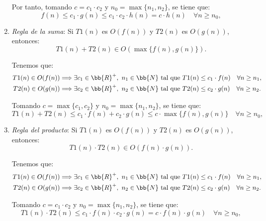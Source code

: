 \begin{ejercicio}
\begin{enumerate}[label=\alph*)]
        Por tanto, tomando $c=c_1\cdot c_2$ y $n_0=\max\{n_1,n_2\}$, se tiene que:
        \begin{equation*}
            f(n)\leq c_1\cdot g(n) \leq c_1\cdot c_2\cdot h(n) = c\cdot h(n) \quad \forall n\geq n_0,
        \end{equation*}

        \item \emph{Regla de la suma}: Si $T1(n)$ es $O(f(n))$ y $T2(n)$ es $O(g(n))$, entonces: $$T1(n)+T2(n)\in O(\max\{f(n),g(n)\}).$$
        
        Tenemos que:
        \begin{align*}
            T1(n)\in O(f(n)) &\Longrightarrow \exists c_1\in \bb{R}^+,~n_1\in \bb{N} \text{ tal que } T1(n)\leq c_1\cdot f(n) \quad \forall n\geq n_1, \\
            T2(n)\in O(g(n)) &\Longrightarrow \exists c_2\in \bb{R}^+,~n_2\in \bb{N} \text{ tal que } T2(n)\leq c_2\cdot g(n) \quad \forall n\geq n_2.
        \end{align*}

        Tomando $c=\max\{c_1,c_2\}$ y $n_0=\max\{n_1,n_2\}$, se tiene que:
        \begin{equation*}
            T1(n)+T2(n)\leq c_1\cdot f(n) + c_2\cdot g(n) \leq c\cdot \max\{f(n),g(n)\} \quad \forall n\geq n_0,
        \end{equation*}

        \item \emph{Regla del producto}: Si $T1(n)$ es $O(f(n))$ y $T2(n)$ es $O(g(n))$, entonces: $$T1(n)\cdot T2(n)\in O(f(n)\cdot g(n)).$$
        
        Tenemos que:
        \begin{align*}
            T1(n)\in O(f(n)) &\Longrightarrow \exists c_1\in \bb{R}^+,~n_1\in \bb{N} \text{ tal que } T1(n)\leq c_1\cdot f(n) \quad \forall n\geq n_1, \\
            T2(n)\in O(g(n)) &\Longrightarrow \exists c_2\in \bb{R}^+,~n_2\in \bb{N} \text{ tal que } T2(n)\leq c_2\cdot g(n) \quad \forall n\geq n_2.
        \end{align*}

        Tomando $c=c_1\cdot c_2$ y $n_0=\max\{n_1,n_2\}$, se tiene que:
        \begin{equation*}
            T1(n)\cdot T2(n)\leq c_1\cdot f(n) \cdot c_2\cdot g(n) = c\cdot f(n)\cdot g(n) \quad \forall n\geq n_0,
        \end{equation*}
    \end{enumerate}
\end{ejercicio}

